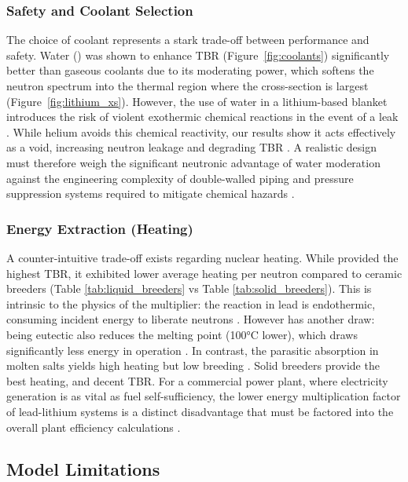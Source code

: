 \documentclass[12pt]{article}
\begin{document}
\subsubsection{Safety and Coolant Selection}
The choice of coolant represents a stark trade-off between performance and safety. Water ()
was shown to enhance TBR (Figure~\ref{fig:coolants}) significantly better than gaseous coolants due
to its moderating power, which softens the neutron spectrum into the thermal region where the
 cross-section is largest (Figure~\ref{fig:lithium_xs}). However, the use of water in a
lithium-based blanket introduces the risk of violent exothermic chemical reactions in the event of a
leak \cite{kawamura_overview_2024, hirose_functional_2024}. While helium avoids this chemical
reactivity, our results show it acts effectively as a void, increasing neutron leakage and degrading
TBR \cite{wang_current_2019}. A realistic design must therefore weigh the significant neutronic
advantage of water moderation against the engineering complexity of double-walled piping and
pressure suppression systems required to mitigate chemical hazards \cite{liu_design_2022}.

\subsubsection{Energy Extraction (Heating)}
A counter-intuitive trade-off exists regarding nuclear heating. While  provided the
highest TBR, it exhibited lower average heating per neutron compared to ceramic breeders (Table
\ref{tab:liquid_breeders} vs Table \ref{tab:solid_breeders}). This is intrinsic to the physics of
the multiplier: the  reaction in lead is endothermic, consuming incident energy to
liberate neutrons \cite{graham_dual_2022}. However  has another draw: being eutectic
also reduces the melting point (100°C lower), which draws significantly less energy in operation
\cite{mas_de_les_valls_leadlithium_2008}. In contrast, the parasitic absorption in molten salts
yields high heating but low breeding \cite{bohm_initial_2023}. Solid breeders provide the best
heating, and decent TBR. For a commercial power plant, where electricity generation is as vital as
fuel self-sufficiency, the lower energy multiplication factor of lead-lithium systems is a distinct
disadvantage that must be factored into the overall plant efficiency calculations
\cite{meschini_modeling_2023}.

\subsection{Model Limitations}
\end{document}
